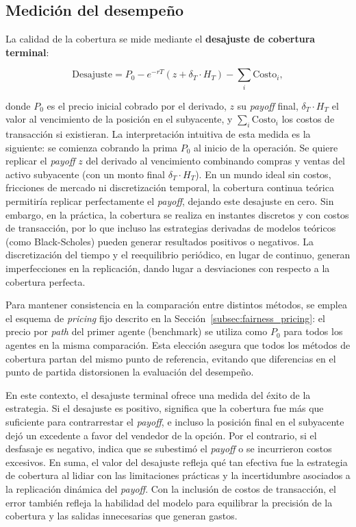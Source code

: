 \documentclass[11pt,a4paper,spanish]{article}
\numberwithin{equation}{section} %
\begin{document}
\subsection{Medición del desempeño}

La calidad de la cobertura se mide mediante el \textbf{desajuste de cobertura terminal}:

\begin{equation}
\text{Desajuste} = P_0 - e^{-rT}(z + \delta_T \cdot H_T) - \sum_{i} \text{Costo}_i,
\end{equation}

donde \(P_0\) es el precio inicial cobrado por el derivado, \(z\) su \textit{payoff} final, \(\delta_T \cdot H_T\) el valor al vencimiento de la posición en el subyacente, y \(\sum_i \text{Costo}_i\) los costos de transacción si existieran.  La interpretación intuitiva de esta medida es la siguiente: se comienza cobrando la prima \(P_0\) al inicio de la operación. Se quiere replicar el \textit{payoff} \(z\) del derivado al vencimiento combinando compras y ventas del activo subyacente (con un monto final \(\delta_T \cdot H_T\)). En un mundo ideal sin costos, fricciones de mercado ni discretización temporal, la cobertura continua teórica permitiría replicar perfectamente el \textit{payoff}, dejando este desajuste en cero. Sin embargo, en la práctica, la cobertura se realiza en instantes discretos y con costos de transacción, por lo que incluso las estrategias derivadas de modelos teóricos (como Black-Scholes) pueden generar resultados positivos o negativos. La discretización del tiempo y el reequilibrio periódico, en lugar de continuo, generan imperfecciones en la replicación, dando lugar a desviaciones con respecto a la cobertura perfecta.

Para mantener consistencia en la comparación entre distintos métodos, se emplea el esquema de \textit{pricing} fijo descrito en la Sección~\ref{subsec:fairness_pricing}: el precio por \textit{path} del primer agente (benchmark) se utiliza como $P_0$ para todos los agentes en la misma comparación. Esta elección asegura que todos los métodos de cobertura partan del mismo punto de referencia, evitando que diferencias en el punto de partida distorsionen la evaluación del desempeño.

En este contexto, el desajuste terminal ofrece una medida del éxito de la estrategia. Si el desajuste es positivo, significa que la cobertura fue más que suficiente para contrarrestar el \textit{payoff}, e incluso la posición final en el subyacente dejó un excedente a favor del vendedor de la opción. Por el contrario, si el desfasaje es negativo, indica que se subestimó el \textit{payoff} o se incurrieron costos excesivos. En suma, el valor del desajuste refleja qué tan efectiva fue la estrategia de cobertura al lidiar con las limitaciones prácticas y la incertidumbre asociados a la replicación dinámica del \textit{payoff}. Con la inclusión de costos de transacción, el error también refleja la habilidad del modelo para equilibrar la precisión de la cobertura y las salidas innecesarias que generan gastos.
\end{document}
